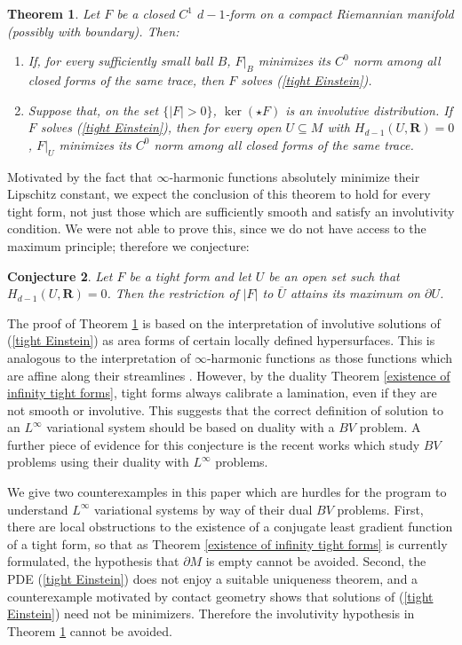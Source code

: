 \documentclass[reqno,11pt]{amsart}
\newcommand{\RR}{\mathbf{R}}
\newtheorem{theorem}{Theorem}[section]
\newtheorem{conjecture}[theorem]{Conjecture}
\theoremstyle{definition}
\numberwithin{equation}{section}
\begin{document}
\begin{theorem}\label{tight are absolute minimizers}
Let $F$ be a closed $C^1$ $d - 1$-form on a compact Riemannian manifold (possibly with boundary). Then:
\begin{enumerate}
\item If, for every sufficiently small ball $B$, $F|_B$ minimizes its $C^0$ norm among all closed forms of the same trace, then $F$ solves (\ref{tight Einstein}).
\item Suppose that, on the set $\{|F| > 0\}$, $\ker(\star F)$ is an involutive distribution.
If $F$ solves (\ref{tight Einstein}), then for every open $U \subseteq M$ with $H_{d - 1}(U, \RR) = 0$, $F|_U$ minimizes its $C^0$ norm among all closed forms of the same trace.
\end{enumerate}
\end{theorem}

Motivated by the fact that $\infty$-harmonic functions absolutely minimize their Lipschitz constant, we expect the conclusion of this theorem to hold for every tight form, not just those which are sufficiently smooth and satisfy an involutivity condition.
We were not able to prove this, since we do not have access to the maximum principle; therefore we conjecture:

\begin{conjecture}
Let $F$ be a tight form and let $U$ be an open set such that $H_{d - 1}(U, \RR) = 0$.
Then the restriction of $|F|$ to $\overline U$ attains its maximum on $\partial U$.
\end{conjecture}

The proof of Theorem \ref{tight are absolute minimizers} is based on the interpretation of involutive solutions of (\ref{tight Einstein}) as area forms of certain locally defined hypersurfaces.
This is analogous to the interpretation of $\infty$-harmonic functions as those functions which are affine along their streamlines \cite[Theorem 1.5]{Sheffield12}.
However, by the duality Theorem \ref{existence of infinity tight forms}, tight forms always calibrate a lamination, even if they are not smooth or involutive.
This suggests that the correct definition of solution to an $L^\infty$ variational system should be based on duality with a $BV$ problem.
A further piece of evidence for this conjecture is the recent works \cite{Mazon14,górny2021applications,górny2022dualitybased} which study $BV$ problems using their duality with $L^\infty$ problems.

We give two counterexamples in this paper which are hurdles for the program to understand $L^\infty$ variational systems by way of their dual $BV$ problems.
First, there are local obstructions to the existence of a conjugate least gradient function of a tight form, so that as Theorem \ref{existence of infinity tight forms} is currently formulated, the hypothesis that $\partial M$ is empty cannot be avoided.
Second, the PDE (\ref{tight Einstein}) does not enjoy a suitable uniqueness theorem, and a counterexample motivated by contact geometry shows that solutions of (\ref{tight Einstein}) need not be minimizers.
Therefore the involutivity hypothesis in Theorem \ref{tight are absolute minimizers} cannot be avoided.
\end{document}
